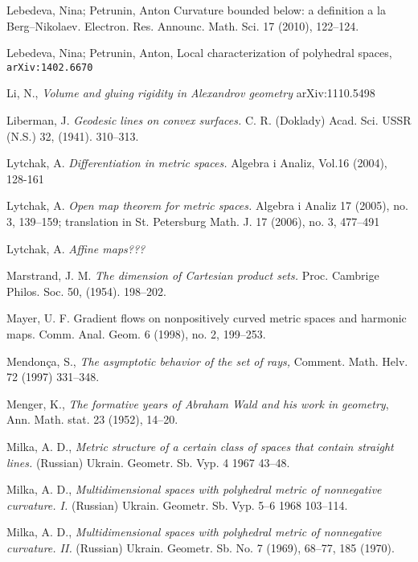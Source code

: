 \begin{thebibliography}{52}
 Lebedeva, Nina; Petrunin, Anton 
Curvature bounded below: a definition a la Berg--Nikolaev. 
Electron. Res. Announc. Math. Sci. 17 (2010), 122--124.

 Lebedeva, Nina; Petrunin, Anton, 
Local characterization of polyhedral spaces,
{\tt arXiv:1402.6670}

Li, N.,
\textit{Volume and gluing rigidity in Alexandrov geometry}
arXiv:1110.5498

Liberman, J. \textit{Geodesic lines on convex surfaces.}  C. R.
(Doklady) Acad. Sci. USSR (N.S.)  32,  (1941). 310--313.

Lytchak, A. \textit{Differentiation in metric spaces.}  Algebra i Analiz, Vol.16 (2004), 128-161 

Lytchak, A. \textit{Open map theorem for metric spaces.}  Algebra i Analiz  17  (2005),  no. 3, 139--159;  translation in  St. Petersburg Math. J.  17  (2006),  no. 3, 477--491 

 Lytchak, A. \textit{Affine maps???}

 Marstrand, J. M. \textit{The dimension of Cartesian product sets.}
Proc. Cambrige Philos. Soc. 50, (1954). 198--202.

 Mayer, U. F. Gradient flows on nonpositively curved metric spaces and harmonic maps. Comm. Anal. Geom. 6 (1998), no. 2, 199--253.

Mendon\c{c}a, S., \textit{The asymptotic behavior of the set of rays,} Comment. Math. Helv. 72 (1997) 331--348.


 Menger, K., \textit{The formative years of Abraham Wald and his work in geometry}, Ann. Math. stat. 23 (1952), 14--20.


Milka, A. D., \textit{Metric structure of a certain class of spaces that contain straight lines.} (Russian) Ukrain. Geometr. Sb. Vyp.  4  1967 43--48.

Milka, A. D., \textit{Multidimensional spaces with polyhedral metric of nonnegative curvature. I.}  (Russian)  Ukrain. Geometr. Sb. Vyp.  5--6 
1968 103--114. 

Milka, A. D., \textit{Multidimensional spaces with polyhedral metric of nonnegative curvature. II.}  (Russian)  Ukrain. Geometr. Sb. No. 7
(1969), 68--77, 185 (1970).


\end{thebibliography}

